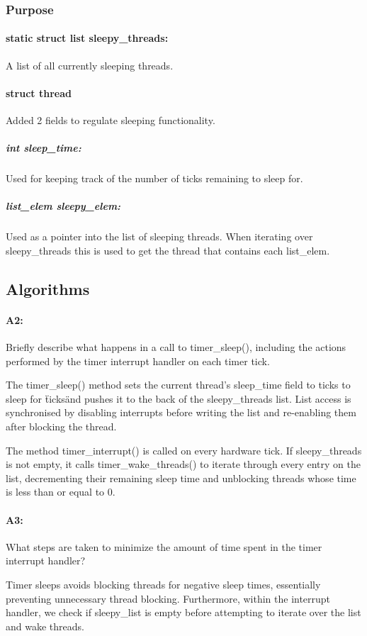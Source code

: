 \documentclass[11pt]{article}
\begin{document}
\subsubsection{Purpose}
\paragraph{static struct list sleepy\_threads:}
A list of all currently sleeping threads.

\paragraph{struct thread}
Added 2 fields to regulate sleeping functionality.

\subparagraph{int sleep\_time:}
Used for keeping track of the number of ticks remaining to sleep for.
\subparagraph{list\_elem sleepy\_elem:}
Used as a pointer into the list of sleeping threads. When iterating over sleepy\_threads this is used to get the thread that contains each list\_elem.

\subsection{Algorithms}
\paragraph{A2:}
Briefly describe what happens in a call to timer\_sleep(), including the actions performed by the timer interrupt handler on each timer tick.

The timer\_sleep() method sets the current thread's sleep\_time field to ticks to sleep for \"ticks\" and pushes it to the back of the sleepy\_threads list. List access is synchronised by disabling interrupts before writing the list and re-enabling them after blocking the thread.

The method timer\_interrupt() is called on every hardware tick. If sleepy\_threads is not empty, it calls timer\_wake\_threads() to iterate through every entry on the list, decrementing their remaining sleep time and unblocking threads whose time is less than or equal to 0.

\paragraph{A3:}
What steps are taken to minimize the amount of time spent in the timer interrupt handler?

Timer sleeps avoids blocking threads for negative sleep times, essentially preventing unnecessary thread blocking. Furthermore, within the interrupt handler, we check if sleepy\_list is empty before attempting to iterate over the list and wake threads.
\end{document}
